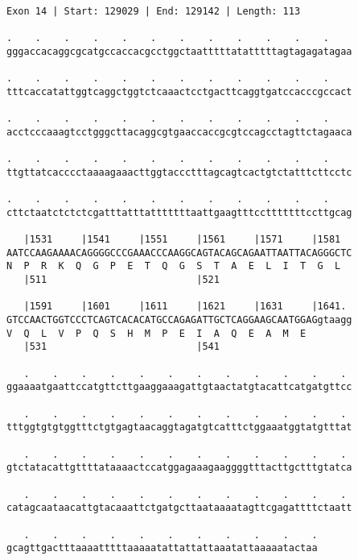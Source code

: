\documentclass{article}
\begin{document}
\begin{Verbatim}
Exon 14 | Start: 129029 | End: 129142 | Length: 113
 
.    .    .    .    .    .    .    .    .    .    .    .    
gggaccacaggcgcatgccaccacgcctggctaatttttatatttttagtagagatagaa
  
.    .    .    .    .    .    .    .    .    .    .    .    
tttcaccatattggtcaggctggtctcaaactcctgacttcaggtgatccacccgccact
  
.    .    .    .    .    .    .    .    .    .    .    .    
acctcccaaagtcctgggcttacaggcgtgaaccaccgcgtccagcctagttctagaaca
  
.    .    .    .    .    .    .    .    .    .    .    .    
ttgttatcacccctaaaagaaacttggtaccctttagcagtcactgtctatttcttcctc
  
.    .    .    .    .    .    .    .    .    .    .    .    
cttctaatctctctcgatttatttatttttttaattgaagtttcctttttttccttgcag
  
   |1531     |1541     |1551     |1561     |1571     |1581  
AATCCAAGAAAACAGGGGCCCGAAACCCAAGGCAGTACAGCAGAATTAATTACAGGGCTC
N  P  R  K  Q  G  P  E  T  Q  G  S  T  A  E  L  I  T  G  L  
   |511                          |521                       
  
   |1591     |1601     |1611     |1621     |1631     |1641. 
GTCCAACTGGTCCCTCAGTCACACATGCCAGAGATTGCTCAGGAAGCAATGGAGgtaagg
V  Q  L  V  P  Q  S  H  M  P  E  I  A  Q  E  A  M  E        
   |531                          |541                       
  
   .    .    .    .    .    .    .    .    .    .    .    . 
ggaaaatgaattccatgttcttgaaggaaagattgtaactatgtacattcatgatgttcc
  
   .    .    .    .    .    .    .    .    .    .    .    . 
tttggtgtgtggtttctgtgagtaacaggtagatgtcatttctggaaatggtatgtttat
  
   .    .    .    .    .    .    .    .    .    .    .    . 
gtctatacattgttttataaaactccatggagaaagaaggggtttacttgctttgtatca
  
   .    .    .    .    .    .    .    .    .    .    .    . 
catagcaataacattgtacaaattctgatgcttaataaaatagttcgagattttctaatt
  
   .    .    .    .    .    .    .    .    .    .    .
gcagttgactttaaaatttttaaaaatattattattaaatattaaaaatactaa
\end{Verbatim}
\newpage
\end{document}
